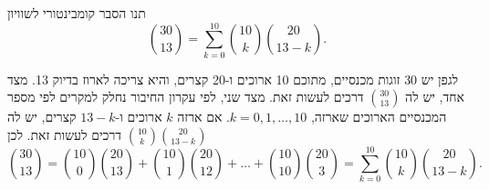 תנו הסבר קומבינטורי לשוויון
\[
\binom{30}{13}=\sum_{k=0}^{10}\binom{10}k\binom{20}{13-k}.
\]
\begin{solbox}
לגפן יש 30 זוגות מכנסיים, מתוכם 10 ארוכים ו-20 קצרים, והיא צריכה לארוז בדיוק 13. מצד אחד, יש לה $\binom{30}{13}$ דרכים לעשות זאת.
מצד שני, לפי עקרון החיבור נחלק למקרים לפי מספר המכנסיים הארוכים שארזה, $k=0,1,\dots,10$. אם ארזה $k$ ארוכים ו-$13-k$ קצרים, יש לה $\binom{10}k\binom{20}{13-k}$ דרכים לעשות זאת. לכן
\[
\binom{30}{13}=\binom{10}0\binom{20}{13}+\binom{10}1\binom{20}{12}+\dots+\binom{10}{10}\binom{20}3=\sum_{k=0}^{10}\binom{10}k\binom{20}{13-k}.
\]
\end{solbox}
